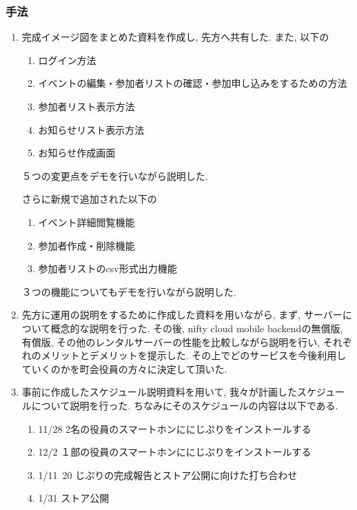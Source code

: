 \subsubsection{手法}
\begin{enumerate}
    \item 完成イメージ図をまとめた資料を作成し, 先方へ共有した. また, 以下の
    \begin{enumerate}
        \item ログイン方法
        \item イベントの編集・参加者リストの確認・参加申し込みをするための方法
        \item 参加者リスト表示方法
        \item お知らせリスト表示方法
        \item お知らせ作成画面
    \end{enumerate}
    ５つの変更点をデモを行いながら説明した.

    さらに新規で追加された以下の
    \begin{enumerate}
        \item イベント詳細閲覧機能
        \item 参加者作成・削除機能
        \item 参加者リストのcsv形式出力機能
    \end{enumerate}
    ３つの機能についてもデモを行いながら説明した.

    \item 先方に運用の説明をするために作成した資料を用いながら, まず, サーバーについて概念的な説明を行った.
    その後, nifty cloud mobile backendの無償版, 有償版, その他のレンタルサーバーの性能を比較しながら説明を行い, それぞれのメリットとデメリットを提示した.
    その上でどのサービスを今後利用していくのかを町会役員の方々に決定して頂いた.

    \item 事前に作成したスケジュール説明資料を用いて, 我々が計画したスケジュールについて説明を行った. ちなみにそのスケジュールの内容は以下である.
    \begin{enumerate}
        \item 11/28 2名の役員のスマートホンににじぷりをインストールする
        \item 12/2 １部の役員のスマートホンににじぷりをインストールする
        \item 1/11~20 じぷりの完成報告とストア公開に向けた打ち合わせ
        \item 1/31 ストア公開
    \end{enumerate}
\end{enumerate}

